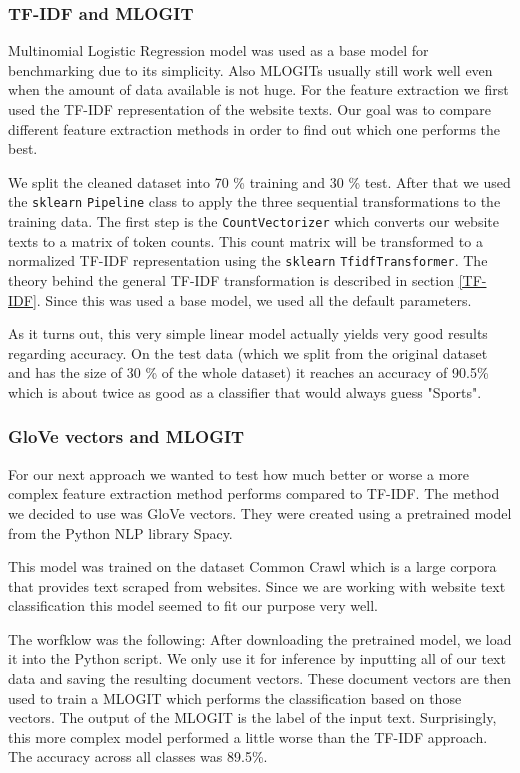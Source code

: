 \documentclass[12pt]{article}
\begin{document}
\subsubsection{TF-IDF and MLOGIT}
Multinomial Logistic Regression model was used as a base model for benchmarking due to its simplicity. Also MLOGITs usually still work well even when the amount of data available is not huge. For the feature extraction we first used the TF-IDF representation of the website texts. Our goal was to compare different feature extraction methods in order to find out which one performs the best.

We split the cleaned dataset into 70 \% training and 30 \% test. After that we used the \texttt{sklearn} \texttt{Pipeline} class to apply the three sequential transformations to the training data. The first step is the \texttt{CountVectorizer} which converts our website texts to a matrix of token counts. This count matrix will be  transformed to a normalized TF-IDF representation using the \texttt{sklearn} \texttt{TfidfTransformer}. The theory behind the general TF-IDF transformation is described in section \ref{TF-IDF}. Since this was used a base model, we used all the default parameters.

As it turns out, this very simple linear model actually yields very good results regarding accuracy. On the test data (which we split from the original dataset and has the size of 30 \% of the whole dataset) it reaches an accuracy of 90.5\% which is about twice as good as a classifier that would always guess "Sports". 


\subsubsection{GloVe vectors and MLOGIT}
For our next approach we wanted to test how much better or worse a more complex feature extraction method performs compared to TF-IDF.
The method we decided to use was GloVe vectors.
They were created using a pretrained model from the Python NLP library Spacy.

This model was trained on the dataset Common Crawl which is a large corpora that provides text scraped from websites.
Since we are working with website text classification this model seemed to fit our purpose very well. 

The worfklow was the following: After downloading the pretrained model, we load it into the Python script. We only use it for inference by inputting all of our text data and saving the resulting document vectors. These document vectors are then used to train a MLOGIT which performs the classification based on those vectors. The output of the MLOGIT is the label of the input text. Surprisingly, this more complex model performed a little worse than the TF-IDF approach. The accuracy across all classes was 89.5\%.
\end{document}
